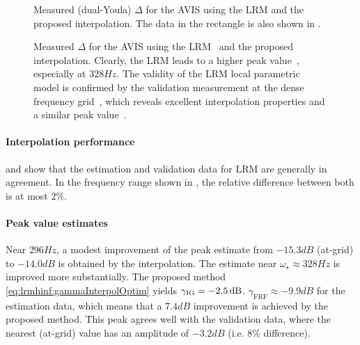 \begin{figure}[p]
 \centering
    \setlength{\figurewidth}{0.7\columnwidth}
    \setlength{\figureheight}{0.68\figurewidth}
    
 \caption[$\Delta$ of the , estimated using local modeling.]{Measured (dual-Youla) $\Delta$ for the \gls{AVIS} using the \gls{LRM} and the proposed interpolation. The data in the rectangle is also shown in .}
\label{fig:lrmhinf:avisMeas}
\end{figure}

\begin{figure}[p]
 \centering
    \setlength{\figurewidth}{0.7\columnwidth}
    \setlength{\figureheight}{0.68\figurewidth}
   
 \caption[$\Delta$ of the , estimated using local modeling (detail).]{Measured $\Delta$ for the \gls{AVIS} using the \gls{LRM}~ and the proposed interpolation. Clearly, the \gls{LRM} leads to a higher peak value~, especially at $328\unit{Hz}$. The validity of the LRM local parametric model is confirmed by the validation measurement at the dense frequency grid~, which reveals excellent interpolation properties and a similar peak value~.}
\label{fig:lrmhinf:avisMeasZoom}
\end{figure}

\paragraph*{Interpolation performance}
\label{sec:lrmhinf:avis-interpol}
 and  show that the estimation and validation data for \gls{LRM} are generally in agreement.
In the frequency range shown in , the relative difference between both is at most $2\%$.

\paragraph*{Peak value estimates}
\label{sec:lrmhinf:avis-peak-value}
Near $296\unit{Hz}$, a modest improvement of the peak estimate from $-15.3 \unit{dB}$ (at-grid) to $-14.0 \unit{dB}$ is obtained by the interpolation.
The estimate near $\omega_{\star} \approx 328\unit{Hz}$ is improved more substantially.
The proposed method \eqref{eq:lrmhinf:gammaInterpolOptim} yields $\gamma_{\mathrm{IG}}=-2.5\,\mathrm{dB}$.
$\gamma_{\mathrm{FRF}}\approx -9.9\unit{dB}$ for the estimation data, which means that a $7.4\unit{dB}$ improvement is achieved by the proposed method.
This peak agrees well with the validation data, where the nearest (at-grid) value has an amplitude of $-3.2\unit{dB}$ (i.e. $8\%$ difference).

